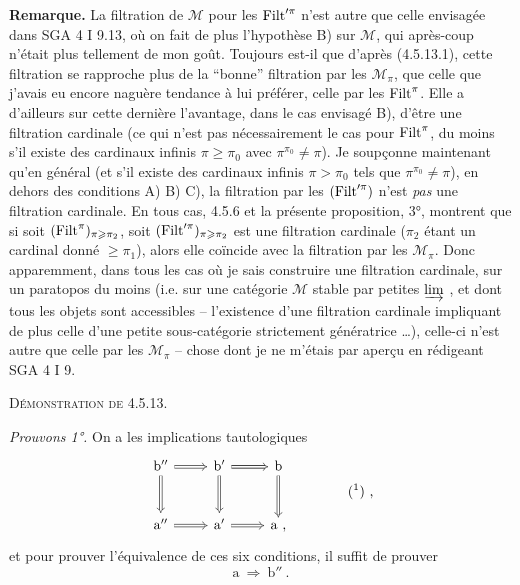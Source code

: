 \textbf{Remarque.} La filtration de $\mathcal{M}$ pour les $\mathrm{Filt}'^{\pi}$ n'est autre que celle envisagée dans SGA 4 I 9.13, où on fait de plus l'hypothèse B) sur $\mathcal{M}$, qui après-coup n'était plus tellement de mon goût. Toujours est-il que d'après (4.5.13.1), cette filtration se rapproche plus de la ``bonne'' filtration par les $\mathcal{M}_{\pi}$, que celle que j'avais eu encore naguère tendance à lui préférer, celle par les $\mathrm{Filt}^{\pi}$. Elle a d'ailleurs sur cette dernière l'avantage, dans le cas envisagé B), d'être une filtration cardinale (ce qui n'est pas nécessairement le cas pour $\mathrm{Filt}^{\pi}$, du moins s'il existe des cardinaux infinis $\pi \geqslant \pi_0$ avec $\pi^{\pi_0} \neq \pi$). Je soupçonne maintenant qu'en général (et s'il existe des cardinaux infinis $\pi > \pi_0$ tels que $\pi^{\pi_0} \neq \pi$), en dehors des conditions A) B) C), la filtration par les $(\mathrm{Filt}'^{\pi})$ n'est \textit{pas} une
filtration cardinale. En tous cas, 4.5.6 et la présente proposition, 3°, montrent que si soit $(\mathrm{Filt}^{\pi})_{\pi\geqslant\pi_2}$, soit $(\mathrm{Filt}'^{\pi})_{\pi\geqslant\pi_2}$ est une filtration cardinale ($\pi_2$ étant un cardinal donné $\geqslant \pi_1$), alors elle coïncide avec la filtration par les $\mathcal{M}_{\pi}$. Donc apparemment, dans tous les cas où je sais construire une filtration cardinale, sur un paratopos du moins (i.e. sur une catégorie $\mathcal{M}$ stable par petites $\varinjlim$ , et dont tous les objets sont accessibles -- l'existence d'une filtration cardinale impliquant de plus celle d'une petite sous-catégorie strictement génératrice \dots), celle-ci n'est autre que celle par les $\mathcal{M}_{\pi}$ -- chose dont je ne m'étais par aperçu en rédigeant SGA 4 I 9. %

\textsc{Démonstration de 4.5.13.}

\textit{Prouvons 1°.} On a les implications tautologiques
\[
\begin{tikzcd}[row sep=large]
\mathrm{b}'' \arrow[r, Rightarrow] \arrow[d, Rightarrow] & \mathrm{b}' \arrow[r, Rightarrow] \arrow[d, Rightarrow] & \mathrm{b} \arrow[d, Rightarrow] \\
\mathrm{a}'' \arrow[r, Rightarrow] & \mathrm{a}' \arrow[r, Rightarrow] & \mathrm{a} \text{ ,}
\end{tikzcd}
\qquad\qquad \text{(\footnotemark) ,}
\]
et pour prouver l'équivalence de ces six conditions, il suffit de prouver
\[ \mathrm{a} \ \Longrightarrow \ \mathrm{b}'' \ . \]

